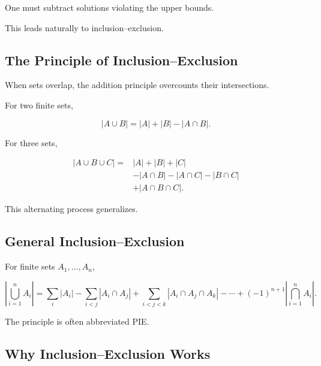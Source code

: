 One must subtract solutions violating the upper bounds.

This leads naturally to inclusion--exclusion.

\subsection{The Principle of Inclusion--Exclusion}
\label{subsec:inclusion-exclusion}

When sets overlap, the addition principle overcounts their
intersections.

For two finite sets,

\[
\boxed{
|A\cup B|
=
|A|+|B|-|A\cap B|.
}
\]

For three sets,

\[
\boxed{
\begin{aligned}
|A\cup B\cup C|
={}&
|A|+|B|+|C|\\
&-|A\cap B|
-|A\cap C|
-|B\cap C|\\
&+|A\cap B\cap C|.
\end{aligned}
}
\]

This alternating process generalizes.

\subsection{General Inclusion--Exclusion}
\label{subsec:general-inclusion-exclusion}

\begin{theorem}
For finite sets \(A_1,\ldots,A_n\),

\[
\boxed{
\left|
\bigcup_{i=1}^{n}A_i
\right|
=
\sum_i|A_i|
-
\sum_{i<j}|A_i\cap A_j|
+
\sum_{i<j<k}|A_i\cap A_j\cap A_k|
-\cdots
+
(-1)^{n+1}
\left|
\bigcap_{i=1}^{n}A_i
\right|.
}
\]
\end{theorem}

The principle is often abbreviated PIE.

\subsection{Why Inclusion--Exclusion Works}
\label{subsec:why-inclusion-exclusion-works}


